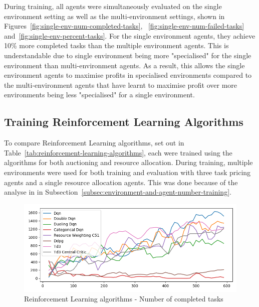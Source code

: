 During training, all agents were simultaneously evaluated on the single environment setting as well as the
multi-environment settings, shown in Figures~\ref{fig:single-env-num-completed-tasks},
~\ref{fig:single-env-num-failed-tasks} and~\ref{fig:single-env-percent-tasks}. For the single environment agents, they
achieve 10\% more completed tasks than the multiple environment agents. This is understandable due to single environment
being more "specialised" for the single environment than multi-environment agents. As a result, this allows the single
environment agents to maximise profits in specialised environments compared to the multi-environment agents that have
learnt to maximise profit over more environments being less "specialised" for a single environment.

\subsection{Training Reinforcement Learning Algorithms}
\label{subsec:training-reinforcement-learning-algorithms}
To compare Reinforcement Learning algorithms, set out in Table~\ref{tab:reinforcement-learning-algorithms},
each were trained using the algorithms for both auctioning and resource allocation. During training, multiple
environments were used for both training and evaluation with three task pricing agents and a single resource allocation
agents. This was done because of the analyse in in Subsection~\ref{subsec:environment-and-agent-number-training}.

\begin{figure}[H]
    \centering
    \includegraphics[width=\linewidth]{figures/5_evaluation_figs/algo_training_fig/num_completed_tasks.png}
    \caption{Reinforcement Learning algorithms - Number of completed tasks}
    \label{fig:algo-num-completed_tasks}
\end{figure}

